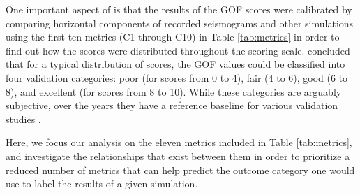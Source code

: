 One important aspect of \citet{Anderson_2004_Proc} is that the results of the GOF scores were calibrated by comparing horizontal components of recorded seismograms and other simulations using the first ten metrics (C1 through C10) in Table \ref{tab:metrics} in order to find out how the scores were distributed throughout the scoring scale. \citeauthor{Anderson_2004_Proc} concluded that for a typical distribution of scores, the GOF values could be classified into four validation categories: poor (for scores from 0 to 4), fair (4 to 6), good (6 to 8), and excellent (for scores from 8 to 10). While these categories are arguably subjective, over the years they have  a reference baseline for various validation studies \citep[e.g.,][]{Chaljub_2010_BSSA, Bielak_2010_GJI, Guidotti_2011_SRL, Maufroy_2015_BSSA}.

Here, we focus our analysis on the eleven metrics included in Table \ref{tab:metrics}, and investigate the relationships that exist between them in order to prioritize a reduced number of metrics that can help predict the outcome category one would use to label the results of a given simulation.
